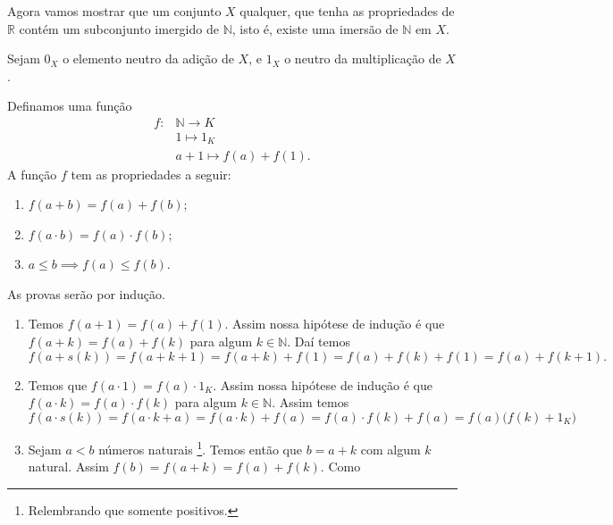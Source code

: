 \documentclass[../main.tex]{subfiles}
\begin{document}
Agora vamos mostrar que um conjunto $X$ qualquer, que tenha as propriedades de $\mathbb{R}$ contém um subconjunto imergido de $\mathbb{N}$, isto é, existe uma imersão de $\mathbb{N}$ em $X$.

Sejam $0_X$ o elemento neutro da adição de $X$, e $1_X$ o neutro da multiplicação de $X$.

\begin{teo}\label{enum-teo-imersaoNK}
    Definamos uma função 
    \begin{align*}
         f \colon & \mathbb{N} \to K \\
         &1 \mapsto 1_K \\
         &a+1 \mapsto f(a)+f(1).
    \end{align*}    
    A função $f$ tem as propriedades a seguir:
    \begin{enumerate}[label=(\roman*)]
        \item $f(a + b) = f(a) + f(b)$;
        \item $f(a \cdot b) = f(a) \cdot f(b)$;
        \item $a \leq b \implies f(a) \leq f(b)$.
    \end{enumerate}
\end{teo}
\begin{dem}
    As provas serão por indução.
    \begin{enumerate}[label=(\roman*)]
        \item 
        Temos $f(a+1) = f(a)+f(1)$. Assim nossa hipótese de indução é que $f(a+k) = f(a)+f(k)$ para algum $k \in \mathbb{N}$.
        Daí temos 
        \[ f(a+s(k)) = f(a+k+1) = f(a+k)+f(1) = f(a) + f(k) + f(1) = f(a) + f(k+1). \]

        \item 
        Temos que $f(a \cdot 1) = f(a) \cdot 1_K$. Assim nossa hipótese de indução é que \\ 
        $f(a \cdot k) = f(a) \cdot f(k)$ para algum $k \in \mathbb{N}$. Assim temos 
        \[ f(a \cdot s(k)) = f(a \cdot k + a) = f(a \cdot k) + f(a) = f(a) \cdot f(k) + f(a) = f(a)\big( f(k)+1_K \big)  \]

        \item 
        Sejam $a < b$ números naturais \footnote{Relembrando que somente positivos.}. Temos então que $b = a+k$ com algum $k$ natural.
        Assim $f(b) = f(a+k) = f(a)+f(k)$.  Como 
        
    \end{enumerate}
\end{dem}
\end{document}

